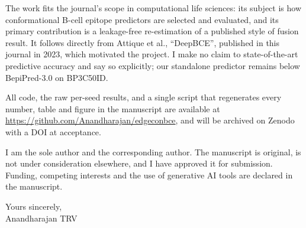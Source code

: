 \documentclass[11pt,a4paper]{article}
\begin{document}
The work fits the journal's scope in computational life sciences: its subject
is how conformational B-cell epitope predictors are selected and evaluated,
and its primary contribution is a leakage-free re-estimation of a published
style of fusion result. It follows directly from Attique et al.,
``DeepBCE'', published in this journal in 2023, which motivated the project.
I make no claim to state-of-the-art predictive accuracy and say so explicitly;
our standalone predictor remains below BepiPred-3.0 on BP3C50ID.

All code, the raw per-seed results, and a single script that regenerates every
number, table and figure in the manuscript are available at
\url{https://github.com/Anandharajan/edgeconbce}, and will be archived on
Zenodo with a DOI at acceptance.

I am the sole author and the corresponding author. The manuscript is original,
is not under consideration elsewhere, and I have approved it for submission.
Funding, competing interests and the use of generative AI tools are declared in
the manuscript.

\vspace{1em}
\noindent Yours sincerely,\\[1.5em]
\noindent Anandharajan TRV
\end{document}
